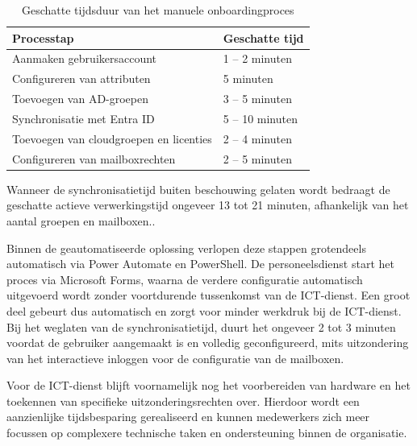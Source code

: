 \begin{table}[htbp]
    \centering
    \begin{tabular}{|p{8cm}|p{4cm}|}
        \hline
        \textbf{Processtap} & \textbf{Geschatte tijd} \\
        \hline
        
        Aanmaken gebruikersaccount & 1 -- 2 minuten \\
        \hline
        
        Configureren van attributen & 5 minuten \\
        \hline
        
        Toevoegen van AD-groepen & 3 -- 5 minuten \\
        \hline
        
        Synchronisatie met Entra ID & 5 -- 10 minuten \\
        \hline
        
        Toevoegen van cloudgroepen en licenties & 2 -- 4 minuten \\
        \hline
        
        Configureren van mailboxrechten & 2 -- 5 minuten \\
        \hline
    \end{tabular}
    \caption{Geschatte tijdsduur van het manuele onboardingproces}
    \label{tab:TijdsvergelijkingOnboarding}
\end{table}

Wanneer de synchronisatietijd buiten beschouwing gelaten wordt bedraagt de geschatte actieve verwerkingstijd  ongeveer 13 tot 21 minuten, afhankelijk van het aantal groepen en mailboxen..

Binnen de geautomatiseerde oplossing verlopen deze stappen grotendeels automatisch via Power Automate en PowerShell. De personeelsdienst start het proces via Microsoft Forms, waarna de verdere configuratie automatisch uitgevoerd wordt zonder voortdurende tussenkomst van de ICT-dienst. Een groot deel gebeurt dus automatisch en zorgt voor minder werkdruk bij de ICT-dienst. Bij het weglaten van de synchronisatietijd, duurt het ongeveer 2 tot 3 minuten voordat de gebruiker aangemaakt is en volledig geconfigureerd, mits uitzondering van het interactieve inloggen voor de configuratie van de mailboxen.

Voor de ICT-dienst blijft voornamelijk nog het voorbereiden van hardware en het toekennen van specifieke uitzonderingsrechten over. Hierdoor wordt een aanzienlijke tijdsbesparing gerealiseerd en kunnen medewerkers zich meer focussen op complexere technische taken en ondersteuning binnen de organisatie.

